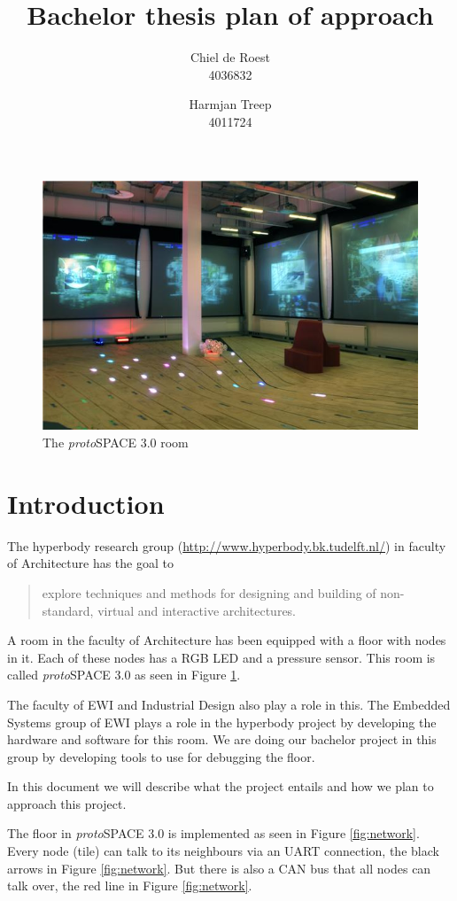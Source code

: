 \documentclass[twocolumn]{article}
\title{Bachelor thesis plan of approach}
\author{Chiel de Roest\\4036832 \and Harmjan Treep\\4011724}
\date{}
\newcommand{\protospace}{\textit{proto}SPACE }
\begin{document}
\maketitle

\begin{figure}
	\centering
	\includegraphics[width=\columnwidth]{protospace}
	\caption{The \protospace 3.0 room}
	\label{fig:protospace}
\end{figure}

\section{Introduction}
	The hyperbody research group (\url{http://www.hyperbody.bk.tudelft.nl/}) in faculty of Architecture has the goal to
	\begin{quote}
		explore techniques and methods for designing and building of non-standard, virtual and interactive architectures.
	\end{quote}
	A room in the faculty of Architecture has been equipped with a floor with nodes in it.
	Each of these nodes has a RGB LED and a pressure sensor.
	This room is called \protospace 3.0 as seen in Figure \ref{fig:protospace}.
	
	The faculty of EWI and Industrial Design also play a role in this.
	The Embedded Systems group of EWI plays a role in the hyperbody project by developing the hardware and software for this room.
	We are doing our bachelor project in this group by developing tools to use for debugging the floor.
	
	In this document we will describe what the project entails and how we plan to approach this project.
	
	The floor in \protospace 3.0 is implemented as seen in Figure \ref{fig:network}.
	Every node (tile) can talk to its neighbours via an UART connection, the black arrows in Figure \ref{fig:network}.
	But there is also a CAN bus that all nodes can talk over, the red line in Figure \ref{fig:network}.
	
\end{document}
